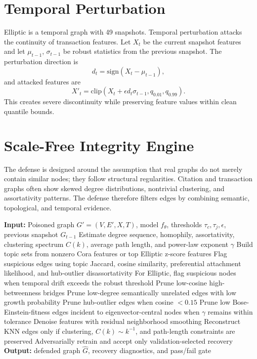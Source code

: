 \documentclass[12pt,oneside]{report}
\begin{document}
\section{Temporal Perturbation}
Elliptic is a temporal graph with 49 snapshots. Temporal perturbation attacks the continuity of transaction features. Let \(X_t\) be the current snapshot features and let \(\mu_{t-1}\), \(\sigma_{t-1}\) be robust statistics from the previous snapshot. The perturbation direction is
\begin{equation}
d_t=\mathrm{sign}(X_t-\mu_{t-1}),
\end{equation}
and attacked features are
\begin{equation}
X'_t=\mathrm{clip}\left(X_t+\epsilon d_t\sigma_{t-1},q_{0.01},q_{0.99}\right).
\end{equation}
This creates severe discontinuity while preserving feature values within clean quantile bounds.

\section{Scale-Free Integrity Engine}
The defense is designed around the assumption that real graphs do not merely contain similar nodes; they follow structural regularities. Citation and transaction graphs often show skewed degree distributions, nontrivial clustering, and assortativity patterns. The defense therefore filters edges by combining semantic, topological, and temporal evidence.

\begin{algorithm}[H]
\caption{Scale-Free Integrity Engine}
\begin{algorithmic}[1]
\STATE \textbf{Input:} Poisoned graph \(G'=(V,E',X,T)\), model \(f_\theta\), thresholds \(\tau_c,\tau_j,\epsilon\), previous snapshot \(G_{t-1}\)
\STATE Estimate degree sequence, homophily, assortativity, clustering spectrum \(C(k)\), average path length, and power-law exponent \(\gamma\)
\STATE Build topic sets from nonzero Cora features or top Elliptic z-score features
\STATE Flag suspicious edges using topic Jaccard, cosine similarity, preferential attachment likelihood, and hub-outlier disassortativity
\STATE For Elliptic, flag suspicious nodes when temporal drift exceeds the robust threshold
\STATE Prune low-cosine high-betweenness bridges
\STATE Prune low-degree semantically unrelated edges with low growth probability
\STATE Prune hub-outlier edges when cosine \(<0.15\)
\STATE Prune low Bose-Einstein-fitness edges incident to eigenvector-central nodes when \(\gamma\) remains within tolerance
\STATE Denoise features with residual neighborhood smoothing
\STATE Reconstruct KNN edges only if clustering, \(C(k)\sim k^{-1}\), and path-length constraints are preserved
\STATE Adversarially retrain and accept only validation-selected recovery
\STATE \textbf{Output:} defended graph \(\hat{G}\), recovery diagnostics, and pass/fail gate
\end{algorithmic}
\end{algorithm}
\end{document}
